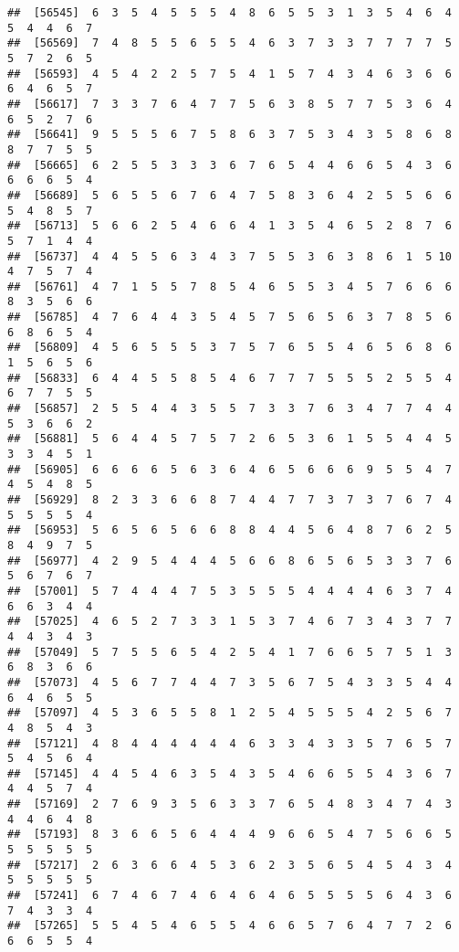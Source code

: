 \documentclass[
]{book}
\begin{document}
\begin{verbatim}
##  [56545]  6  3  5  4  5  5  5  4  8  6  5  5  3  1  3  5  4  6  4  5  4  4  6  7
##  [56569]  7  4  8  5  5  6  5  5  4  6  3  7  3  3  7  7  7  7  5  5  7  2  6  5
##  [56593]  4  5  4  2  2  5  7  5  4  1  5  7  4  3  4  6  3  6  6  6  4  6  5  7
##  [56617]  7  3  3  7  6  4  7  7  5  6  3  8  5  7  7  5  3  6  4  6  5  2  7  6
##  [56641]  9  5  5  5  6  7  5  8  6  3  7  5  3  4  3  5  8  6  8  8  7  7  5  5
##  [56665]  6  2  5  5  3  3  3  6  7  6  5  4  4  6  6  5  4  3  6  6  6  6  5  4
##  [56689]  5  6  5  5  6  7  6  4  7  5  8  3  6  4  2  5  5  6  6  5  4  8  5  7
##  [56713]  5  6  6  2  5  4  6  6  4  1  3  5  4  6  5  2  8  7  6  5  7  1  4  4
##  [56737]  4  4  5  5  6  3  4  3  7  5  5  3  6  3  8  6  1  5 10  4  7  5  7  4
##  [56761]  4  7  1  5  5  7  8  5  4  6  5  5  3  4  5  7  6  6  6  8  3  5  6  6
##  [56785]  4  7  6  4  4  3  5  4  5  7  5  6  5  6  3  7  8  5  6  6  8  6  5  4
##  [56809]  4  5  6  5  5  5  3  7  5  7  6  5  5  4  6  5  6  8  6  1  5  6  5  6
##  [56833]  6  4  4  5  5  8  5  4  6  7  7  7  5  5  5  2  5  5  4  6  7  7  5  5
##  [56857]  2  5  5  4  4  3  5  5  7  3  3  7  6  3  4  7  7  4  4  5  3  6  6  2
##  [56881]  5  6  4  4  5  7  5  7  2  6  5  3  6  1  5  5  4  4  5  3  3  4  5  1
##  [56905]  6  6  6  6  5  6  3  6  4  6  5  6  6  6  9  5  5  4  7  4  5  4  8  5
##  [56929]  8  2  3  3  6  6  8  7  4  4  7  7  3  7  3  7  6  7  4  5  5  5  5  4
##  [56953]  5  6  5  6  5  6  6  8  8  4  4  5  6  4  8  7  6  2  5  8  4  9  7  5
##  [56977]  4  2  9  5  4  4  4  5  6  6  8  6  5  6  5  3  3  7  6  5  6  7  6  7
##  [57001]  5  7  4  4  4  7  5  3  5  5  5  4  4  4  4  6  3  7  4  6  6  3  4  4
##  [57025]  4  6  5  2  7  3  3  1  5  3  7  4  6  7  3  4  3  7  7  4  4  3  4  3
##  [57049]  5  7  5  5  6  5  4  2  5  4  1  7  6  6  5  7  5  1  3  6  8  3  6  6
##  [57073]  4  5  6  7  7  4  4  7  3  5  6  7  5  4  3  3  5  4  4  6  4  6  5  5
##  [57097]  4  5  3  6  5  5  8  1  2  5  4  5  5  5  4  2  5  6  7  4  8  5  4  3
##  [57121]  4  8  4  4  4  4  4  4  6  3  3  4  3  3  5  7  6  5  7  5  4  5  6  4
##  [57145]  4  4  5  4  6  3  5  4  3  5  4  6  6  5  5  4  3  6  7  4  4  5  7  4
##  [57169]  2  7  6  9  3  5  6  3  3  7  6  5  4  8  3  4  7  4  3  4  4  6  4  8
##  [57193]  8  3  6  6  5  6  4  4  4  9  6  6  5  4  7  5  6  6  5  5  5  5  5  5
##  [57217]  2  6  3  6  6  4  5  3  6  2  3  5  6  5  4  5  4  3  4  5  5  5  5  5
##  [57241]  6  7  4  6  7  4  6  4  6  4  6  5  5  5  5  6  4  3  6  7  4  3  3  4
##  [57265]  5  5  4  5  4  6  5  5  4  6  6  5  7  6  4  7  7  2  6  6  6  5  5  4

\end{verbatim}
\end{document}
